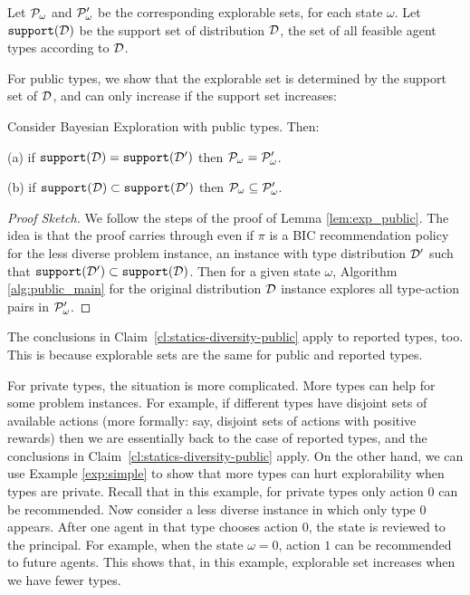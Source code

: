 Let $\mathcal{P}_\omega$ and $\mathcal{P}_\omega'$ be the corresponding explorable sets, for each state $\omega$. Let $\mathtt{support}(\mathcal{D})$ be the support set of distribution $\mathcal{D}$, \ie the set of all feasible agent types according to $\mathcal{D}$.

For public types, we show that the explorable set is determined by the support set of $\mathcal{D}$, and can only increase if the support set increases:

\begin{claim}\label{cl:statics-diversity-public}
Consider Bayesian Exploration with public types. Then:
\begin{OneLiners}
\item[(a)] if $\mathtt{support}(\mathcal{D})=\mathtt{support}(\mathcal{D}')$ then $\mathcal{P}_\omega=\mathcal{P}_\omega'$.
\item[(b)] if $\mathtt{support}(\mathcal{D})\subset \mathtt{support}(\mathcal{D}')$ then $\mathcal{P}_\omega\subseteq \mathcal{P}_\omega'$.
\end{OneLiners}
\end{claim}

\begin{proof}[Proof Sketch]
We follow the steps of the proof of Lemma \ref{lem:exp_public}. The idea is that the proof carries through even if $\pi$ is a BIC recommendation policy for the less diverse problem instance, \ie an instance with type distribution $\mathcal{D}'$ such that $\mathtt{support}(\mathcal{D}')\subset \mathtt{support}(\mathcal{D})$. Then for a given state $\omega$, Algorithm \ref{alg:public_main} for the original distribution $\mathcal{D}$ instance explores all type-action pairs in $\mathcal{P}_\omega'$.
\end{proof}

The conclusions in Claim~\ref{cl:statics-diversity-public} apply to reported types, too. This is because explorable sets are the same for public and reported types.

For private types, the situation is more complicated. More types can help for some problem instances. For example, if different types have disjoint sets of available actions (more formally: say, disjoint sets of actions with positive rewards) then we are essentially back to the case of reported types, and the conclusions in Claim~\ref{cl:statics-diversity-public} apply. On the other hand, 
we can use Example \ref{exp:simple} to show that more types can hurt explorability when types are private. Recall that in this example, for private types only action 0 can be recommended. Now consider a less diverse instance in which only type 0 appears. After one agent in that type chooses action 0, the state is reviewed to the principal. For example, when the state $\omega = 0$, action $1$ can be recommended to future agents. This shows that,  in this example, explorable set increases when we have fewer types. 